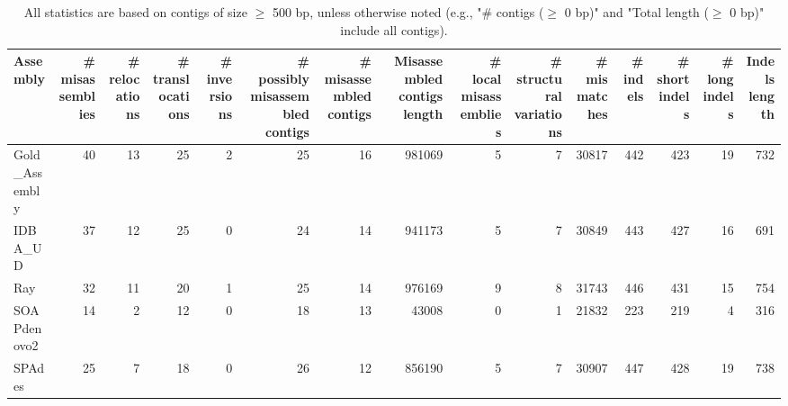 \documentclass[12pt,a4paper]{article}
\begin{document}
\begin{table}[ht]
\begin{center}
\caption{All statistics are based on contigs of size $\geq$ 500 bp, unless otherwise noted (e.g., "\# contigs ($\geq$ 0 bp)" and "Total length ($\geq$ 0 bp)" include all contigs).}
\begin{tabular}{|l*{14}{|r}|}
\hline
Assembly & \# misassemblies &     \# relocations &     \# translocations &     \# inversions & \# possibly misassembled contigs & \# misassembled contigs & Misassembled contigs length & \# local misassemblies & \# structural variations & \# mismatches & \# indels &     \# short indels &     \# long indels & Indels length \\ \hline
Gold\_Assembly & 40 & 13 & 25 & 2 & 25 & 16 & 981069 & 5 & 7 & 30817 & 442 & 423 & 19 & 732 \\ \hline
IDBA\_UD & 37 & 12 & 25 & 0 & 24 & 14 & 941173 & 5 & 7 & 30849 & 443 & 427 & 16 & 691 \\ \hline
Ray & 32 & 11 & 20 & 1 & 25 & 14 & 976169 & 9 & 8 & 31743 & 446 & 431 & 15 & 754 \\ \hline
SOAPdenovo2 & 14 & 2 & 12 & 0 & 18 & 13 & 43008 & 0 & 1 & 21832 & 223 & 219 & 4 & 316 \\ \hline
SPAdes & 25 & 7 & 18 & 0 & 26 & 12 & 856190 & 5 & 7 & 30907 & 447 & 428 & 19 & 738 \\ \hline
\end{tabular}
\end{center}
\end{table}
\end{document}
